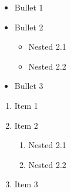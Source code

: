 \documentclass{article}
\begin{document}
\begin{itemize}
\item Bullet 1
\item Bullet 2
\begin{itemize}
\item Nested 2.1
\item Nested 2.2
\end{itemize}
\item Bullet 3
\end{itemize}

\begin{enumerate}
\item Item 1
\item Item 2
\begin{enumerate}
\item Nested 2.1
\item Nested 2.2
\end{enumerate}
\item Item 3
\end{enumerate}
\end{document}
